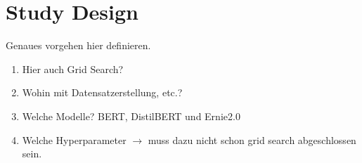 \section{Study Design}
\label{chp:study:sec:study_design}

Genaues vorgehen hier definieren.

\begin{enumerate}
    \item Hier auch Grid Search?
    \item Wohin mit Datensatzerstellung, etc.?
    \item Welche Modelle? BERT, DistilBERT und Ernie2.0
    \item Welche Hyperparameter $\rightarrow$ muss dazu nicht schon grid search abgeschlossen sein.
\end{enumerate}
